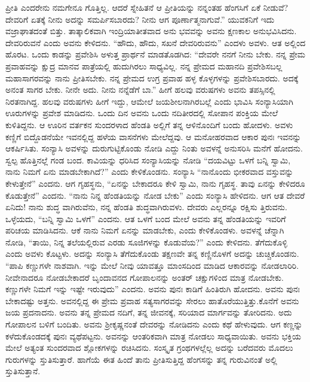 ಪ್ರೀತಿ ಎಂದರೇನು ನಮಗೇನೂ ಗೊತ್ತಿಲ್ಲ. ಆದರೆ ಸ್ನೇಹಿತನೆ ಆ ಪ್ರೀತಿಯನ್ನು ನನ್ನಂತಹ ಹೆಂಗಸಿಗೆ ಏಕೆ ನೀಡುವೆ? ದೇವರಿಗೆ ಏತಕ್ಕೆ ನೀನು ಅದನ್ನು ಸಮರ್ಪಿಸಬಾರದು? ನೀನು ಆಗ ಪೂರ್ಣಾತ್ಮನಾಗುವೆ.” ಯುವಕನಿಗೆ ಇದು ವಜ್ರಾಘಾತದಂತೆ ಬಿತ್ತು. ತಾತ್ಕಾಲಿಕವಾಗಿ ಇಂದ್ರಿಯಾತೀತವಾದ ಅನು ಭವವನ್ನು ಅವನು ಕ್ಷಣಕಾಲ ಅನುಭವಿಸಿದನು. ದೇವರಿರುವನೆ ಎಂದು ಅವನು ಕೇಳಿದನು. “ಹೌದು, ಹೌದು, ಸಖನೆ ದೇವರಿರುವನು” ಎಂದಳು ಅವಳು. ಆತ ಅಲ್ಲಿಂದ ಹೊರಟ. ಒಂದು ಕಾಡನ್ನು ಪ್ರವೇಶಿಸಿ ಅಳುತ್ತ ಪ್ರಾರ್ಥನೆ ಮಾಡತೊಡಗಿದ: “ದೇವರೇ ನನಗೆ ನೀನು ಬೇಕು. ನನ್ನ ಪ್ರೇಮ ಪ್ರವಾಹವನ್ನು ಕ್ಷುದ್ರ ಮಾನವ ಪಾತ್ರೆಯಲ್ಲಿ ಹುದುಗಿರಲು ಸಾಧ್ಯವಿಲ್ಲ. ನನ್ನ ಪ್ರೇಮದ ಮಹಾನದಿ ಪ್ರವೇಶಿಸಬಲ್ಲ ಮಹಾಸಾಗರವನ್ನು ನಾನು ಪ್ರೀತಿಸಬೇಕು. ನನ್ನ ಪ್ರೇಮದ ಉಗ್ರ ಪ್ರವಾಹ ಹಳ್ಳ ಕೊಳ್ಳಗಳನ್ನು ಪ್ರವೇಶಿಸಬಾರದು. ಅದಕ್ಕೆ ಅನಂತ ಸಾಗರ ಬೇಕು. ನೀನೇ ಅದು. ನೀನು ನನ್ನೆಡೆಗೆ ಬಾ.” ಹೀಗೆ ಹಲವು ವರುಷಗಳು ಅವನು ತಪಸ್ಸಿನಲ್ಲಿ ನಿರತನಾಗಿದ್ದ. ಹಲವು ವರುಷಗಳು ಹೀಗೆ ಇದ್ದು, ಆಮೇಲೆ ಜಯಶೀಲನಾಗಿರಬಲ್ಲೆ ಎಂದು ಭಾವಿಸಿ ಸಂನ್ಯಾಸಿಯಾಗಿ ಊರುಗಳನ್ನು ಪ್ರವೇಶ ಮಾಡಿದನು. ಒಂದು ದಿನ ಅವನು ಒಂದು ನದಿತೀರದಲ್ಲಿ ಸೋಪಾನ ಪಂಕ್ತಿಯ ಮೇಲೆ ಕುಳಿತಿದ್ದನು. ಆ ಊರಿನ ವರ್ತಕನ ಸುಂದರಳಾದ ಹೆಂಡತಿ ಅಲ್ಲಿಗೆ ತನ್ನ ಆಳಿನೊಂದಿಗೆ ಬಂದು ಹೋದಳು. ಅವಳು ಕಣ್ಣಿಗೆ ಬಿದ್ದೊಡನೆಯೇ ಇವನಲ್ಲಿದ್ದ ಹಳೆಯ ವಾಸನೆಗಳು ಮೇಲೆದ್ದವು. ಆ ಮನೋಹರವಾದ ಆಕಾರ ಪುನಃ ಇವನನ್ನು ಆಕರ್ಷಿಸಿತು. ಸಂನ್ಯಾಸಿ ಅವಳನ್ನು ದುರುಗುಟ್ಟಿಕೊಂಡು ನೋಡಿ ಎದ್ದು ನಿಂತು ಅವಳನ್ನೆ ಅನುಸರಿಸಿ ಮನೆಗೆ ಹೋದನು. ಸ್ವಲ್ಪ ಹೊತ್ತಿನಲ್ಲೆ ಗಂಡ ಬಂದ. ಕಾವಿಯನ್ನು ಧರಿಸಿದ ಸಂನ್ಯಾಸಿಯನ್ನು ನೋಡಿ “ದಯವಿಟ್ಟು ಒಳಗೆ ಬನ್ನಿ ಸ್ವಾಮಿ, ನಾನು ನಿಮಗೆ ಏನು ಮಾಡಬೇಕಾಗಿದೆ?” ಎಂದು ಕೇಳಿಕೊಂಡನು. ಸಂನ್ಯಾಸಿ “ನಾನೊಂದು ಭೀಕರವಾದ ವಸ್ತುವನ್ನು ಕೇಳುತ್ತೇನೆ” ಎಂದನು. ಆಗ ಗೃಹಸ್ಥನು, “ಏನನ್ನು ಬೇಕಾದರೂ ಕೇಳಿ ಸ್ವಾಮಿ, ನಾನು ಗೃಹಸ್ಥ. ತಾವು ಏನನ್ನು ಕೇಳಿದರೂ ಕೊಡುತ್ತೇನೆ” ಎಂದನು. “ನಾನು ನಿನ್ನ ಹೆಂಡತಿಯನ್ನು ನೋಡ ಬೇಕು” ಎಂದು ಸಂನ್ಯಾಸಿ ಹೇಳಿದನು. ಆಗ ಆತ ದೇವರೆ ಏನಿದು! ನಾನು ಶುದ್ಧ ವಾಗಿರುವೆನು, ನನ್ನ ಹೆಂಡತಿ ಶುದ್ಧವಾಗಿರುವಳು. ದೇವರು ಎಲ್ಲರನ್ನೂ ರಕ್ಷಿಸು ತ್ತಿರುವನು. ಒಳ್ಳೆಯದು, “ಬನ್ನಿ ಸ್ವಾಮಿ ಒಳಗೆ” ಎಂದನು. ಆತ ಒಳಗೆ ಬಂದ ಮೇಲೆ ಅವನು ತನ್ನ ಹೆಂಡತಿಯನ್ನು ಇವರಿಗೆ ಪರಿಚಯ ಮಾಡಿಸಿದನು. ಆಕೆ ನಾನು ನಿಮಗೆ ಏನನ್ನು ಮಾಡಬೇಕು, ಎಂದು ಕೇಳಿಕೊಂಡಳು. ಅವಳನ್ನೆ ಚೆನ್ನಾಗಿ ನೋಡಿ, “ತಾಯಿ, ನಿನ್ನ ತಲೆಯಲ್ಲಿರುವ ಎರಡು ಸೂಜಿಗಳನ್ನು ಕೊಡುವೆಯ?” ಎಂದು ಕೇಳಿದನು. ತೆಗೆದುಕೊಳ್ಳಿ ಎಂದು ಅವಳು ಕೊಟ್ಟಳು. ಅದನ್ನು ಸಂನ್ಯಾಸಿ ತೆಗೆದುಕೊಂಡು ತಕ್ಷಣವೇ ತನ್ನ ಕಣ್ಣಿನೊಳಗೆ ಅದನ್ನು ಚುಚ್ಚಿಕೊಂಡನು. “ಪಾಪಿ ಕಣ್ಣುಗಳೇ ನಾಶವಾಗಿ. ಇನ್ನು ಮೇಲೆ ನೀವು ಯಾವತ್ತೂ ಮಾಂಸದಿಂದ ಮಾಡಿದ ಆಕಾರವನ್ನು ನೋಡಲಾರಿರಿ. ನೀವೇನಾದರೂ ನೋಡಬೇಕಾದರೆ ಬೃಂದಾವನದ ಗೋಪಾಲನನ್ನು ಅಂತರ್​ ಚಕ್ಷುಗಳಿಂದ ಮಾತ್ರ ನೋಡಬೇಕು. ಕಣ್ಣುಗಳೇ ನಿಮಗೆ ಇನ್ನು ಇಷ್ಟೇ ಇರುವುದು” ಎಂದನು. ಅವನು ಪುನಃ ಕಾಡಿಗೆ ಹಿಂತಿರುಗಿ ಹೋದನು. ಅವನು ಪುನಃ ಬೇಕಾದಷ್ಟು ಅತ್ತನು. ಅವನಲ್ಲಿದ್ದ ಈ ಪ್ರೇಮ ಪ್ರವಾಹ ಸತ್ಯಸಾಗರವನ್ನು ಸೇರಲು ಹಾತೊರೆಯುತ್ತಿತ್ತು.ಕೊನೆಗೆ ಅವನು ಜಯ ಪ್ರದನಾದನು. ಅವನು ತನ್ನ ಪ್ರೇಮದ ನದಿಗೆ, ತನ್ನ ಜೀವನಕ್ಕೆ, ಸರಿಯಾದ ಮಾರ್ಗವನ್ನು ತೋರಿದನು. ಅದು ಗೋಪಾಲನ ಬಳಿಗೆ ಬಂದಿತು. ಅವನು ಶ‍್ರೀಕೃಷ್ಣನಂತೆ ದೇವರನ್ನು ನೋಡಿದನು ಎಂದು ಕಥೆ ಹೇಳುವುದು. ಆಗ ಕಣ್ಣನ್ನು ಕಳೆದುಕೊಂಡದಕ್ಕೆ ಪುನಃ ವ್ಯಥೆಪಟ್ಟನು. ಅವನನ್ನು ಆಂತರಿಕವಾಗಿ ಮಾತ್ರ ನೋಡಲು ಸಾಧ್ಯವಾಯಿತು. ಅವನು ಭಕ್ತಿಯ ಮೇಲೆ ಅತ್ಯಂತ ಸುಂದರವಾದ ಶ್ಲೋಕಗಳನ್ನು ರಚಿಸಿದನು. ಸಂಸ್ಕೃತ ಗ್ರಂಥಗಳಲ್ಲೆಲ್ಲ ಅದನ್ನು ಬರೆದವರು ಮೊದಲು ಗುರುಗಳನ್ನು ಸ್ತುತಿಸುತ್ತಾರೆ. ಹಾಗೆಯೆ ಈತ ಹಿಂದೆ ತಾನು ಪ್ರೀತಿಸುತ್ತಿದ್ದ ಹೆಂಗಸನ್ನು ತನ್ನ ಗುರುವಿನಂತೆ ಅಲ್ಲಿ ಸ್ತುತಿಸುತ್ತಾನೆ.

